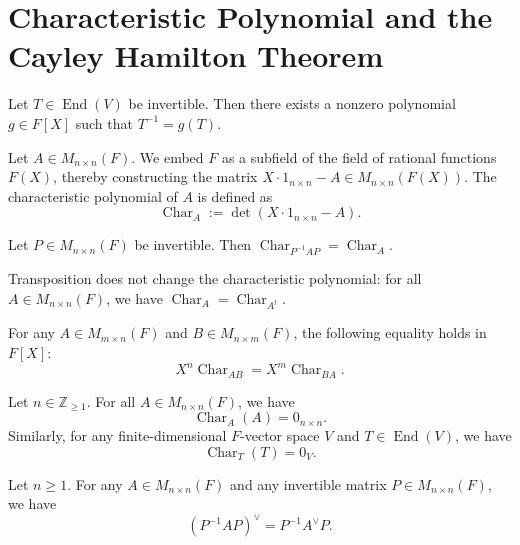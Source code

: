 \section{Characteristic Polynomial and the Cayley Hamilton Theorem}

\begin{proposition}
Let $T \in \operatorname{End}(V)$ be invertible. Then there exists a nonzero polynomial $g \in F[X]$ such that $T^{-1} = g(T)$.
\end{proposition}

\begin{definition}
Let $A \in M_{n \times n}(F)$. We embed $F$ as a subfield of the field of rational functions $F(X)$, thereby constructing the matrix $X \cdot 1_{n \times n} - A \in M_{n \times n}(F(X))$. The characteristic polynomial of $A$ is defined as
\[
\operatorname{Char}_A := \det(X \cdot 1_{n \times n} - A).
\]
\end{definition}

\begin{proposition}
Let $P \in M_{n \times n}(F)$ be invertible. Then $\operatorname{Char}_{P^{-1}AP} = \operatorname{Char}_A$.
\end{proposition}

\begin{proposition}
Transposition does not change the characteristic polynomial: for all $A \in M_{n \times n}(F)$, we have $\operatorname{Char}_A = \operatorname{Char}_{A^t}$.
\end{proposition}

\begin{proposition}
For any $A \in M_{m \times n}(F)$ and $B \in M_{n \times m}(F)$, the following equality holds in $F[X]$:
\[
X^n \operatorname{Char}_{AB} = X^m \operatorname{Char}_{BA}.
\]
\end{proposition}

\begin{theorem}
Let $n \in \mathbb{Z}_{\geq 1}$. For all $A \in M_{n \times n}(F)$, we have
\[
\operatorname{Char}_A(A) = 0_{n \times n}.
\]
Similarly, for any finite-dimensional $F$-vector space $V$ and $T \in \operatorname{End}(V)$, we have
\[
\operatorname{Char}_T(T) = 0_V.
\]
\end{theorem}

\begin{corollary}
Let $n \geq 1$. For any $A \in M_{n \times n}(F)$ and any invertible matrix $P \in M_{n \times n}(F)$, we have
\[
(P^{-1} A P)^\vee = P^{-1} A^\vee P.
\]
\end{corollary}
